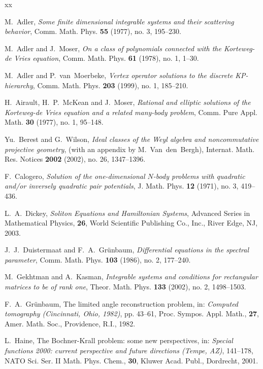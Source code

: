\documentclass[11pt,reqno]{amsart}
\theoremstyle{definition}
\numberwithin{equation}{section}
\begin{document}
\begin{thebibliography}{xx}

 M.~Adler,  {\em Some finite dimensional integrable systems and 
their scattering behavior}, Comm. Math. Phys. {\bf 55} (1977), no. 3, 
195--230.

 M.~Adler and J.~Moser, {\em On a class of polynomials connected 
with the Korteweg-de Vries equation},  Comm. Math. Phys.  {\bf 61}  (1978), 
no. 1, 1--30.

 M.~Adler and P.~van~Moerbeke, {\em Vertex operator solutions to 
the discrete KP-hierarchy}, Comm. Math. Phys. {\bf 203} (1999), no. 1, 
185--210.

 H.~Airault, H.~P.~McKean and J.~Moser, {\em Rational and 
elliptic solutions of the Korteweg-de Vries equation and a related many-body 
problem}, Comm. Pure Appl. Math. {\bf 30} (1977), no. 1, 95--148.


 Yu.~Berest and G.~Wilson, {\em Ideal classes of the Weyl algebra 
and noncommutative projective geometry}, (with an appendix by 
M.~Van~den~Bergh), Internat. Math. Res. Notices 
{\bf 2002} (2002), no. 26, 1347--1396. 

 F.~Calogero, {\em Solution of the one-dimensional $N$-body 
problems with quadratic and/or inversely quadratic pair potentials}, 
J. Math. Phys. {\bf 12} (1971), no. 3, 419--436.

 L.~A.~Dickey, {\em Soliton Equations and Hamiltonian 
Systems}, Advanced Series in Mathematical Physics, {\bf 26}, World Scientific 
Publishing Co., Inc., River Edge, NJ, 2003.

 J.~J.~Duistermaat and F.~A.~Gr\"unbaum, {\em Differential 
equations in the spectral parameter}, Comm. Math. Phys. {\bf 103} (1986), 
no. 2, 177--240.

 M.~Gekhtman and A.~Kasman, {\em Integrable systems and conditions 
for rectangular matrices to be of rank one}, Theor. Math. Phys. {\bf 133} 
(2002), no. 2, 1498--1503.

 F.~A.~Gr\"unbaum, The limited angle reconstruction problem, in:  
{\em Computed tomography (Cincinnati, Ohio, 1982)},  pp. 43--61, 
Proc. Sympos. Appl. Math., {\bf 27}, Amer. Math. Soc., Providence, R.I., 1982.

  L.~Haine, The Bochner-Krall problem: some new perspectives, in: 
{\em Special functions 2000: current perspective and future directions (Tempe, 
AZ)},  141--178, NATO Sci. Ser. II Math. Phys. Chem., {\bf 30}, Kluwer Acad. 
Publ., Dordrecht, 2001.


\end{thebibliography}
\end{document}
